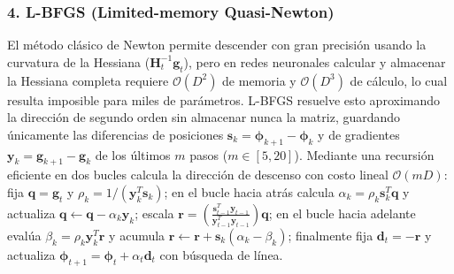 \documentclass[10pt,a4paper]{article}
\begin{document}
{\subsubsection*{4. L-BFGS (Limited-memory Quasi-Newton)}
El método clásico de Newton permite descender con gran precisión usando la curvatura de la Hessiana ($\mathbf{H}_t^{-1} \mathbf{g}_t$), pero en redes neuronales calcular y almacenar la Hessiana completa requiere $\mathcal{O}(D^2)$ de memoria y $\mathcal{O}(D^3)$ de cálculo, lo cual resulta imposible para miles de parámetros. L-BFGS resuelve esto aproximando la dirección de segundo orden sin almacenar nunca la matriz, guardando únicamente las diferencias de posiciones $\mathbf{s}_k = \boldsymbol{\phi}_{k+1} - \boldsymbol{\phi}_k$ y de gradientes $\mathbf{y}_k = \mathbf{g}_{k+1} - \mathbf{g}_k$ de los últimos $m$ pasos ($m \in [5, 20]$). Mediante una recursión eficiente en dos bucles calcula la dirección de descenso con costo lineal $\mathcal{O}(mD)$: fija $\mathbf{q} = \mathbf{g}_t$ y $\rho_k = 1/(\mathbf{y}_k^T \mathbf{s}_k)$; en el bucle hacia atrás calcula $\alpha_k = \rho_k \mathbf{s}_k^T \mathbf{q}$ y actualiza $\mathbf{q} \leftarrow \mathbf{q} - \alpha_k \mathbf{y}_k$; escala $\mathbf{r} = \left(\frac{\mathbf{s}_{t-1}^T \mathbf{y}_{t-1}}{\mathbf{y}_{t-1}^T \mathbf{y}_{t-1}}\right) \mathbf{q}$; en el bucle hacia adelante evalúa $\beta_k = \rho_k \mathbf{y}_k^T \mathbf{r}$ y acumula $\mathbf{r} \leftarrow \mathbf{r} + \mathbf{s}_k (\alpha_k - \beta_k)$; finalmente fija $\mathbf{d}_t = -\mathbf{r}$ y actualiza $\boldsymbol{\phi}_{t+1} = \boldsymbol{\phi}_t + \alpha_t \mathbf{d}_t$ con búsqueda de línea.
}
\end{document}
